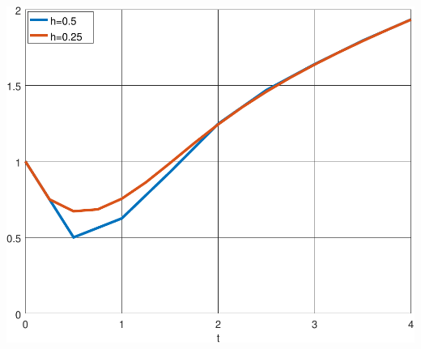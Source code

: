 \documentclass[urlcolor=blue,dvipsnames]{beamer}
\begin{document}
\begin{frame}[fragile]
\begin{columns}
\begin{column}{0.45\textwidth}
\mbox{\quad \includegraphics[width=\textwidth]{figs/euler1basic}}
\end{column}
\end{columns}
\end{frame}
\end{document}

